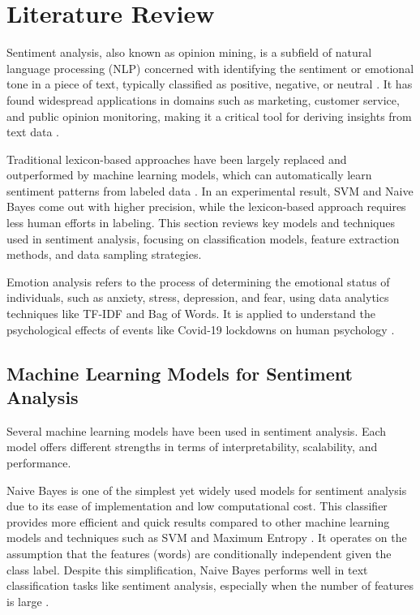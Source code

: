 

\section{Literature Review}

Sentiment analysis, also known as opinion mining, is a subfield of natural language processing (NLP) concerned with identifying the sentiment or emotional tone in a piece of text, typically classified as positive, negative, or neutral \cite{Saad2017}. It has found widespread applications in domains such as marketing, customer service, and public opinion monitoring, making it a critical tool for deriving insights from text data \cite{Rodriguez2023}.

Traditional lexicon-based approaches have been largely replaced and outperformed by machine learning models, which can automatically learn sentiment patterns from labeled data \cite{Mahmood2020}. In an experimental result, SVM and Naive Bayes come out with higher precision, while the lexicon-based approach requires less human efforts in labeling. This section reviews key models and techniques used in sentiment analysis, focusing on classification models, feature extraction methods, and data sampling strategies.

Emotion analysis refers to the process of determining the emotional status of individuals, such as anxiety, stress, depression, and fear, using data analytics techniques like TF-IDF and Bag of Words. It is applied to understand the psychological effects of events like Covid-19 lockdowns on human psychology \cite{Chatterjee2023}.

\subsection{Machine Learning Models for Sentiment Analysis}

Several machine learning models have been used in sentiment analysis. Each model offers different strengths in terms of interpretability, scalability, and performance.


Naive Bayes is one of the simplest yet widely used models for sentiment analysis due to its ease of implementation and low computational cost. This classifier provides more efficient and quick results compared to other machine learning models and techniques such as SVM and Maximum Entropy \cite{Mathapati2017}. It operates on the assumption that the features (words) are conditionally independent given the class label. Despite this simplification, Naive Bayes performs well in text classification tasks like sentiment analysis, especially when the number of features is large \cite{Saini2021}.

